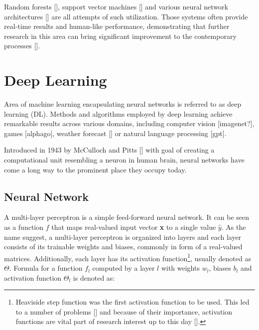 
Random forests [], support vector machines [] and various neural network architectures [] are all attempts of such utilization. Those systems often provide real-time results and human-like performance, demonstrating that further research in this area can bring significant improvement to the contemporary processes [].


\section{Deep Learning}

Area of machine learning encapsulating neural networks is referred to as deep learning (DL). Methods and algorithms employed by deep learning achieve remarkable results across various domains, including computer vision [imagenet?], games [alphago], weather forecast [] or natural language processing [gpt].

Introduced in 1943 by McCulloch and Pitts [] with goal of creating a computational unit resembling a neuron in human brain, neural networks have come a long way to the prominent place they occupy today.


\subsection*{Neural Network}

A multi-layer perceptron is a simple feed-forward neural network. It can be seen as a function $f$ that maps real-valued input vector \textbf{x} to a single value $\hat{y}$. As the name suggest, a multi-layer perceptron is organized into layers and each layer consists of its trainable weights and biases, commonly in form of a real-valued matrices. Additionally, each layer has its activation function\footnote{Heaviside step function was the first activation function to be used. This led to a number of problems [] and because of their importance, activation functions are vital part of research interest up to this day [].}, usually denoted as $\Theta$. Formula for a function $f_l$ computed by a layer $l$ with weights $w_l$, biases $b_l$ and activation function $\Theta_l$ is denoted as:

